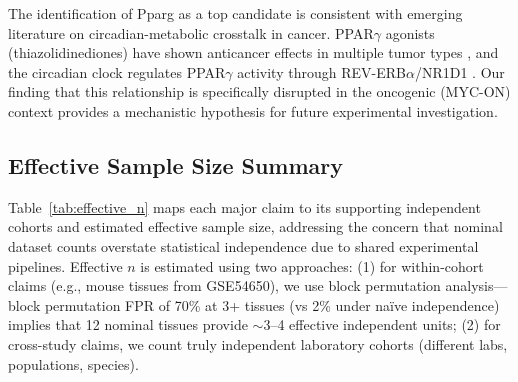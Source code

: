 \documentclass[11pt,a4paper]{article}
\begin{document}
The identification of Pparg as a top candidate is consistent with emerging literature on circadian-metabolic crosstalk in cancer. PPAR$\gamma$ agonists (thiazolidinediones) have shown anticancer effects in multiple tumor types \citep{michalik2004international}, and the circadian clock regulates PPAR$\gamma$ activity through REV-ERB$\alpha$/NR1D1 \citep{wang2008regulation}. Our finding that this relationship is specifically disrupted in the oncogenic (MYC-ON) context provides a mechanistic hypothesis for future experimental investigation.

\subsection{Effective Sample Size Summary}

Table~\ref{tab:effective_n} maps each major claim to its supporting independent cohorts and estimated effective sample size, addressing the concern that nominal dataset counts overstate statistical independence due to shared experimental pipelines. Effective $n$ is estimated using two approaches: (1) for within-cohort claims (e.g., mouse tissues from GSE54650), we use block permutation analysis---block permutation FPR of 70\% at 3+ tissues (vs 2\% under na\"ive independence) implies that 12 nominal tissues provide $\sim$3--4 effective independent units; (2) for cross-study claims, we count truly independent laboratory cohorts (different labs, populations, species).
\end{document}
